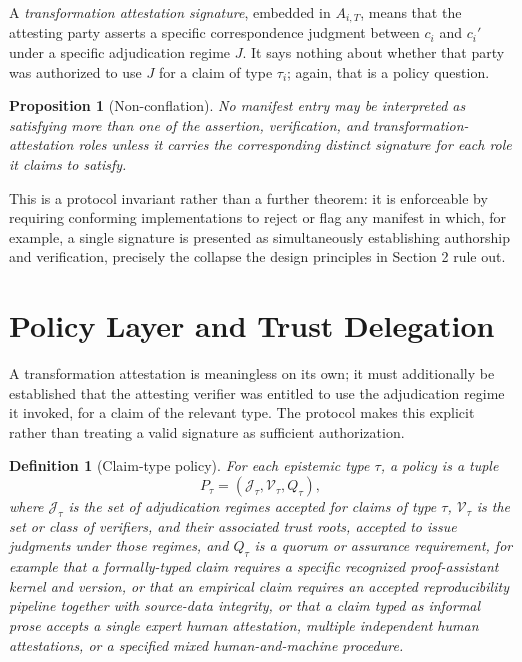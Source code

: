 \documentclass[11pt]{article}
\newtheorem{definition}{Definition}
\newtheorem{proposition}{Proposition}
\begin{document}
A \emph{transformation attestation signature}, embedded in $A_{i,T}$, means that the attesting party asserts a specific correspondence judgment between $c_i$ and $c_i'$ under a specific adjudication regime $J$. It says nothing about whether that party was authorized to use $J$ for a claim of type $\tau_i$; again, that is a policy question.

\begin{proposition}[Non-conflation]
No manifest entry may be interpreted as satisfying more than one of the assertion, verification, and transformation-attestation roles unless it carries the corresponding distinct signature for each role it claims to satisfy.
\end{proposition}

This is a protocol invariant rather than a further theorem: it is enforceable by requiring conforming implementations to reject or flag any manifest in which, for example, a single signature is presented as simultaneously establishing authorship and verification, precisely the collapse the design principles in Section 2 rule out.

\section{Policy Layer and Trust Delegation}

A transformation attestation is meaningless on its own; it must additionally be established that the attesting verifier was entitled to use the adjudication regime it invoked, for a claim of the relevant type. The protocol makes this explicit rather than treating a valid signature as sufficient authorization.

\begin{definition}[Claim-type policy]
For each epistemic type $\tau$, a policy is a tuple
\[
P_\tau = (\mathcal{J}_\tau, \mathcal{V}_\tau, Q_\tau),
\]
where $\mathcal{J}_\tau$ is the set of adjudication regimes accepted for claims of type $\tau$, $\mathcal{V}_\tau$ is the set or class of verifiers, and their associated trust roots, accepted to issue judgments under those regimes, and $Q_\tau$ is a quorum or assurance requirement, for example that a formally-typed claim requires a specific recognized proof-assistant kernel and version, or that an empirical claim requires an accepted reproducibility pipeline together with source-data integrity, or that a claim typed as informal prose accepts a single expert human attestation, multiple independent human attestations, or a specified mixed human-and-machine procedure.
\end{definition}
\end{document}
